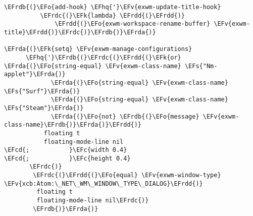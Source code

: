 \documentclass[a4wide,10pt]{article}
\newcommand{\EFc}[1]{\textcolor{EFc}{#1}} %
\newcommand{\EFcd}[1]{\textcolor{EFcd}{#1}} %
\newcommand{\EFs}[1]{\textcolor{EFs}{#1}} %
\newcommand{\EFk}[1]{\textcolor{EFk}{#1}} %
\newcommand{\EFv}[1]{\textcolor{EFv}{#1}} %
\newcommand{\EFo}[1]{\textcolor{EFo}{#1}} %
\newcommand{\EFhq}[1]{\textcolor{EFhq}{#1}} %
\newcommand{\EFrda}[1]{\textcolor{EFrda}{#1}} %
\newcommand{\EFrdb}[1]{\textcolor{EFrdb}{#1}} %
\newcommand{\EFrdc}[1]{\textcolor{EFrdc}{#1}} %
\newcommand{\EFrdd}[1]{\textcolor{EFrdd}{#1}} %
\begin{document}
\begin{Code}
\begin{Verbatim}
\EFrdb{(}\EFo{add-hook} \EFhq{'}\EFv{exwm-update-title-hook}
          \EFrdc{(}\EFk{lambda} \EFrdd{(}\EFrdd{)}
              \EFrdd{(}\EFo{exwm-workspace-rename-buffer} \EFv{exwm-title}\EFrdd{)}\EFrdc{)}\EFrdb{)}\EFrda{)}

\EFrda{(}\EFk{setq} \EFv{exwm-manage-configurations}
      \EFhq{'}\EFrdb{(}\EFrdc{(}\EFrdd{(}\EFk{or} \EFrda{(}\EFo{string-equal} \EFv{exwm-class-name} \EFs{"Nm-applet"}\EFrda{)}
             \EFrda{(}\EFo{string-equal} \EFv{exwm-class-name} \EFs{"Surf"}\EFrda{)}
             \EFrda{(}\EFo{string-equal} \EFv{exwm-class-name} \EFs{"Steam"}\EFrda{)}
             \EFrda{(}\EFo{not} \EFrdb{(}\EFo{message} \EFv{exwm-class-name}\EFrdb{)}\EFrda{)}\EFrdd{)}
           floating t
           floating-mode-line nil
\EFcd{;           }\EFc{width 0.4}
\EFcd{;           }\EFc{height 0.4}
	   \EFrdc{)}
        \EFrdc{(}\EFrdd{(}\EFo{equal} \EFv{exwm-window-type} \EFv{xcb:Atom:\_NET\_WM\_WINDOW\_TYPE\_DIALOG}\EFrdd{)}
         floating t
         floating-mode-line nil\EFrdc{)}
        \EFrdb{)}\EFrda{)}


\end{Verbatim}
\end{Code}
\end{document}
